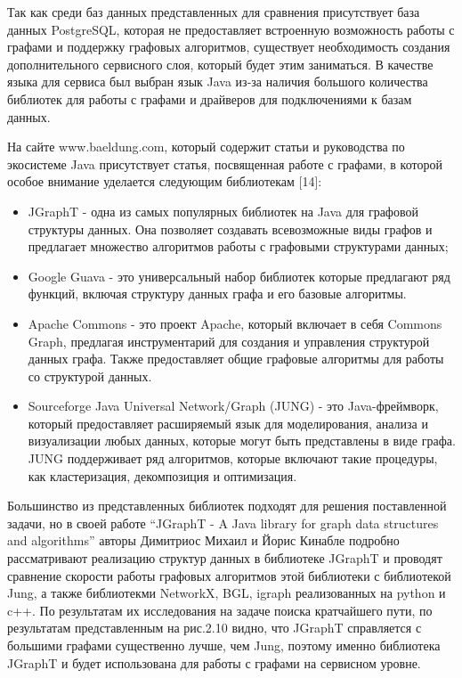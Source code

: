 Так как среди баз данных представленных для сравнения присутствует база данных PostgreSQL, которая не предоставляет встроенную возможность
работы с графами и поддержку графовых алгоритмов, существует необходимость создания дополнительного сервисного слоя, который будет этим
заниматься. В качестве языка для сервиса был выбран язык Java из-за наличия большого количества библиотек для работы с графами и драйверов
для подключениями к базам данных.

На сайте www.baeldung.com, который содержит статьи и руководства по экосистеме Java присутствует статья, посвященная работе с графами, в
которой особое внимание уделается следующим библиотекам [14]:

\begin{itemize}
    \item JGraphT - одна из самых популярных библиотек на Java для графовой структуры данных. Она позволяет создавать всевозможные виды графов и предлагает множество алгоритмов работы с графовыми структурами данных;
    \item Google Guava - это универсальный набор библиотек которые предлагают ряд функций, включая структуру данных графа и его базовые алгоритмы.
    \item Apache Commons - это проект Apache, который включает в себя Commons Graph, предлагая инструментарий для создания и управления структурой данных графа. Также предоставляет общие графовые алгоритмы для работы со структурой данных.
    \item Sourceforge Java Universal Network/Graph (JUNG) - это Java-фреймворк, который предоставляет расширяемый язык для моделирования, анализа и визуализации любых данных, которые могут быть представлены в виде графа. JUNG поддерживает ряд алгоритмов, которые включают такие процедуры, как кластеризация, декомпозиция и оптимизация.
\end{itemize}

Большинство из представленных библиотек подходят для решения поставленной задачи, но в своей работе “JGraphT - A Java library for graph
data structures and algorithms” авторы Димитриос Михаил и Йорис Кинабле подробно рассматривают реализацию структур данных в библиотеке
JGraphT и проводят сравнение скорости работы графовых алгоритмов этой библиотеки с библиотекой Jung, а также библиотекми NetworkX, BGL,
igraph реализованных на python и c++. По результатам их исследования на задаче поиска кратчайшего пути, по результатам представленным
на рис.2.10 видно, что JGraphT справляется с большими графами существенно лучше, чем Jung, поэтому именно библиотека JGraphT и будет
использована для работы с графами на сервисном уровне.


